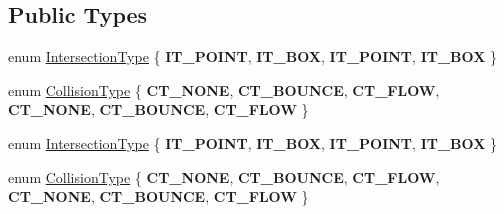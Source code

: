 \subsection*{Public Types}
\begin{DoxyCompactItemize}
\item 
enum \hyperlink{classPUBaseCollider_ae86fc81f78c00a88e8e927377a86e81c}{Intersection\+Type} \{ {\bfseries I\+T\+\_\+\+P\+O\+I\+NT}, 
{\bfseries I\+T\+\_\+\+B\+OX}, 
{\bfseries I\+T\+\_\+\+P\+O\+I\+NT}, 
{\bfseries I\+T\+\_\+\+B\+OX}
 \}
\item 
enum \hyperlink{classPUBaseCollider_a13f646d7a12d1abb3cca3043c817e726}{Collision\+Type} \{ \newline
{\bfseries C\+T\+\_\+\+N\+O\+NE}, 
{\bfseries C\+T\+\_\+\+B\+O\+U\+N\+CE}, 
{\bfseries C\+T\+\_\+\+F\+L\+OW}, 
{\bfseries C\+T\+\_\+\+N\+O\+NE}, 
\newline
{\bfseries C\+T\+\_\+\+B\+O\+U\+N\+CE}, 
{\bfseries C\+T\+\_\+\+F\+L\+OW}
 \}
\item 
enum \hyperlink{classPUBaseCollider_ae86fc81f78c00a88e8e927377a86e81c}{Intersection\+Type} \{ {\bfseries I\+T\+\_\+\+P\+O\+I\+NT}, 
{\bfseries I\+T\+\_\+\+B\+OX}, 
{\bfseries I\+T\+\_\+\+P\+O\+I\+NT}, 
{\bfseries I\+T\+\_\+\+B\+OX}
 \}
\item 
enum \hyperlink{classPUBaseCollider_a13f646d7a12d1abb3cca3043c817e726}{Collision\+Type} \{ \newline
{\bfseries C\+T\+\_\+\+N\+O\+NE}, 
{\bfseries C\+T\+\_\+\+B\+O\+U\+N\+CE}, 
{\bfseries C\+T\+\_\+\+F\+L\+OW}, 
{\bfseries C\+T\+\_\+\+N\+O\+NE}, 
\newline
{\bfseries C\+T\+\_\+\+B\+O\+U\+N\+CE}, 
{\bfseries C\+T\+\_\+\+F\+L\+OW}
 \}
\end{DoxyCompactItemize}
